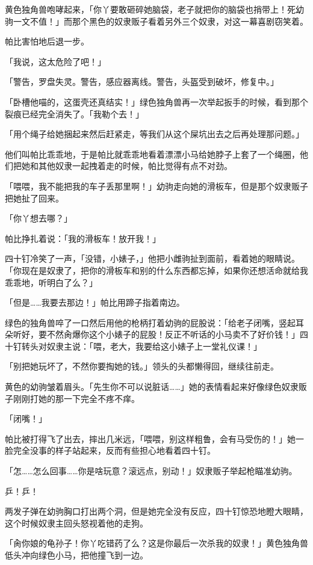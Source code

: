 黄色独角兽咆哮起来，「你丫要敢砸碎她脑袋，老子就把你的脑袋也捎带上！死幼驹一文不值！」而那个黑色的奴隶贩子看着另外三个奴隶，对这一幕喜剧窃笑着。

帕比害怕地后退一步。

「我说，这太危险了吧！」

「{\mt 警告，罗盘失灵。警告，感应器离线。警告，头盔受到破坏，修复中。}」

「卧槽他喵的，这蛋壳还真结实！」绿色独角兽再一次举起扳手的时候，看到那个裂痕已经完全消失了。「我勒个去！」

「用个绳子给她捆起来然后赶紧走，等我们从这个屎坑出去之后再处理那问题。」

他们叫帕比乖乖地，于是帕比就乖乖地看着漂漂小马给她脖子上套了一个绳圈，他们把她和其他奴隶一起拽着走的时候，帕比觉得有点不对劲。

「喂喂，我不能把我的车子丢那里啊！」幼驹走向她的滑板车，但是那个奴隶贩子把她扯了回来。

「你丫想去哪？」

帕比挣扎着说：「我的滑板车！放开我！」

四十钉冷笑了一声，「没错，小婊子，」他把小雌驹扯到面前，看着她的眼睛说。「你现在是奴隶了，把你的滑板车和别的什么东西都忘掉，如果你还想活命就给我乖乖地，听明白了么？」

「但是……我要去那边！」帕比用蹄子指着南边。

绿色的独角兽啐了一口然后用他的枪柄打着幼驹的屁股说：「给老子闭嘴，竖起耳朵听好，要不然肏爆你这个小婊子的屁股！反正不听话的小马卖不了好价钱！」四十钉转头对奴隶主说：「喂，老大，我要给这小婊子上一堂礼仪课！」

「别把她玩坏了，不然你要掏她的钱。」领头的头都懒得回，继续往前走。

黄色的幼驹皱着眉头。「先生你不可以说脏话……」她的表情看起来好像绿色奴隶贩子刚刚打她的那一下完全不疼不痒。

「闭嘴！」

帕比被打得飞了出去，摔出几米远，「喂喂，别这样粗鲁，会有马受伤的！」她一脸完全没事的样子站起来，反而有些担心地看着四十钉。

「怎……怎么回事……你是啥玩意？滚远点，别动！」奴隶贩子举起枪瞄准幼驹。

乒！乒！


两发子弹在幼驹胸口打出两个洞，但是她完全没有反应，四十钉惊恐地瞪大眼睛，这个时候奴隶主回头怒视着他的走狗。

「肏你娘的龟孙子！你丫吃错药了么？这是你最后一次杀我的奴隶！」黄色独角兽低头冲向绿色小马，把他撞飞到一边。

